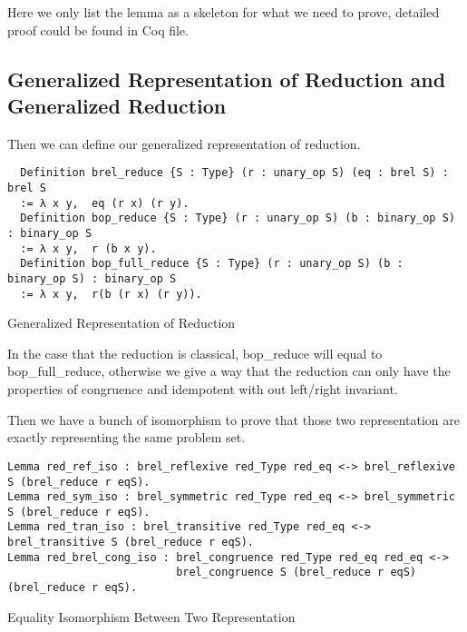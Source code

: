 Here we only list the lemma as a skeleton for what we need to prove, detailed proof could be found in Coq file.

\subsection{Generalized Representation of Reduction and Generalized Reduction}
Then we can define our generalized representation of reduction.
\begin{listing}[H]
\begin{verbatim}
  Definition brel_reduce {S : Type} (r : unary_op S) (eq : brel S) : brel S
  := λ x y,  eq (r x) (r y).   
  Definition bop_reduce {S : Type} (r : unary_op S) (b : binary_op S) : binary_op S
  := λ x y,  r (b x y).
  Definition bop_full_reduce {S : Type} (r : unary_op S) (b : binary_op S) : binary_op S
  := λ x y,  r(b (r x) (r y)).   
\end{verbatim}
\caption{Generalized Representation of Reduction} 
\label{coq:def:generalized_representation}
\end{listing}
In the case that the reduction is classical, bop\_reduce will equal to bop\_full\_reduce, otherwise we give a way that the reduction can only have the properties of congruence and idempotent with out left/right invariant.

Then we have a bunch of isomorphism to prove that those two representation are exactly representing the same problem set.
\begin{listing}[H]
\begin{verbatim}
Lemma red_ref_iso : brel_reflexive red_Type red_eq <-> brel_reflexive S (brel_reduce r eqS).
Lemma red_sym_iso : brel_symmetric red_Type red_eq <-> brel_symmetric S (brel_reduce r eqS).
Lemma red_tran_iso : brel_transitive red_Type red_eq <-> brel_transitive S (brel_reduce r eqS).
Lemma red_brel_cong_iso : brel_congruence red_Type red_eq red_eq <-> 
                          brel_congruence S (brel_reduce r eqS) (brel_reduce r eqS).
\end{verbatim}
\caption{Equality Isomorphism Between Two Representation} 
\label{coq:proof:eq_iso}
\end{listing}

